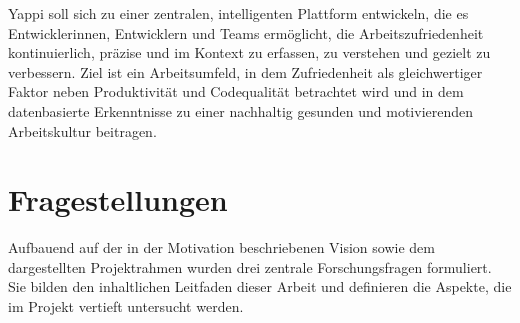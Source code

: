 \documentclass[12pt,a4paper]{report}
\begin{document}
Yappi soll sich zu einer zentralen, intelligenten Plattform entwickeln, die es Entwicklerinnen, Entwicklern und Teams ermöglicht,
die Arbeitszufriedenheit kontinuierlich, präzise und im Kontext zu erfassen, zu verstehen und gezielt zu verbessern. Ziel ist ein
Arbeitsumfeld, in dem Zufriedenheit als gleichwertiger Faktor neben Produktivität und Codequalität betrachtet wird und in dem
datenbasierte Erkenntnisse zu einer nachhaltig gesunden und motivierenden Arbeitskultur beitragen.

\section{Fragestellungen}\label{fragestellungen}

Aufbauend auf der in der Motivation beschriebenen Vision sowie dem dargestellten Projektrahmen wurden drei zentrale 
Forschungsfragen formuliert. Sie bilden den inhaltlichen Leitfaden dieser Arbeit und definieren die Aspekte, die im Projekt
vertieft untersucht werden.
\end{document}
